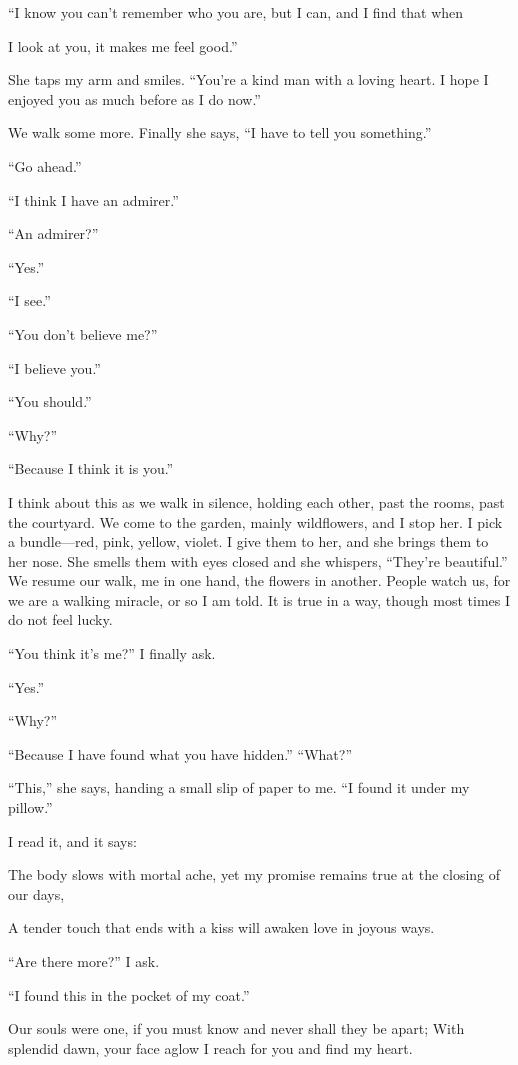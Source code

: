 \documentclass[10pt, twoside, openright]{book}
\begin{document}
``I know you can't remember who you are, but I can, and I find that when


I look at you, it makes me feel good.''

She taps my arm and smiles. ``You're a kind man with a loving heart. I
hope I enjoyed you as much before as I do now.''


We walk some more. Finally she says, ``I have to tell you something.''

``Go ahead.''

``I think I have an admirer.''

``An admirer?''

``Yes.''

``I see.''

``You don't believe me?''

``I believe you.''

``You should.''

``Why?''

``Because I think it is you.''


I think about this as we walk in silence, holding each other, past the
rooms, past the courtyard. We come to the garden, mainly wildflowers,
and I stop her. I pick a bundle---red, pink, yellow, violet. I give them
to her, and she brings them to her nose. She smells them with eyes
closed and she whispers, ``They're beautiful.'' We resume our walk, me
in one hand, the flowers in another. People watch us, for we are a
walking miracle, or so I am told. It is true in a way, though most times
I do not feel lucky.


``You think it's me?'' I finally ask.

``Yes.''

``Why?''

``Because I have found what you have hidden.'' ``What?''


``This,'' she says, handing a small slip of paper to me. ``I found it
under my pillow.''


I read it, and it says:


The body slows with mortal ache, yet my promise remains true at the
closing of our days,


A tender touch that ends with a kiss will awaken love in joyous ways.

``Are there more?'' I ask.

``I found this in the pocket of my coat.''

Our souls were one, if you must know and never shall they be apart; With
splendid dawn, your face aglow I reach for you and find my heart.
\end{document}
